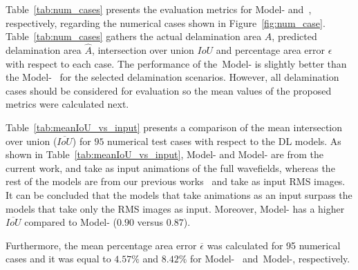 Table~\ref{tab:num_cases} presents the evaluation metrics for Model- 
and~, respectively, regarding the numerical cases shown in 
Figure~\ref{fig:num_case}.
Table~\ref{tab:num_cases} gathers the actual delamination area \(A\), predicted delamination area \(\hat{A}\), intersection over union \(IoU\) and percentage area error \(\epsilon\) with respect to each case. 
The performance of the~Model- is slightly better than the Model-~ for the selected delamination scenarios.
However, all delamination cases should be considered for evaluation so the mean values of the proposed metrics were calculated next.

Table~\ref{tab:meanIoU_vs_input} presents a comparison of the mean intersection over union (\(\overline{IoU}\)) for \(95\) numerical test cases with respect to the DL models.
As shown in Table~\ref{tab:meanIoU_vs_input}, Model- and Model- are from the current work, and take as input animations of the full wavefields, whereas the rest of the models are from our previous works~\cite{Ijjeh2021, Ijjeh2022} and take as input RMS images.
It can be concluded that the models that take animations as an input surpass the models that take only the RMS images as input. 
Moreover, Model- has a higher \(\overline{IoU}\) compared to Model- (\(0.90\) versus \(0.87\)).

Furthermore, the mean percentage area error \(\overline{\epsilon}\) was calculated for 95 numerical cases and it was equal to \(4.57 \%\) and \(8.42\%\) for Model-~ and~Model-, respectively.

